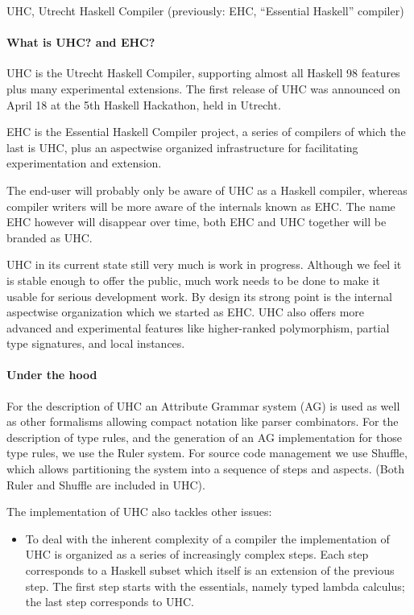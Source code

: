\begin{hcarentry}{UHC, Utrecht Haskell Compiler (previously: EHC, ``Essential Haskell'' compiler)}
\label{uhc}
\label{ehc}
\makeheader

\paragraph{What is UHC? and EHC?}
UHC is the Utrecht Haskell Compiler, supporting almost all Haskell 98 features plus many
experimental extensions.
The first release of UHC was announced on April 18 at the 5th Haskell Hackathon, held in Utrecht.

EHC is the Essential Haskell Compiler project, a series of compilers of which the last is UHC, plus 
an aspectwise organized infrastructure for facilitating experimentation and extension.

The end-user will probably only be aware of UHC as a Haskell compiler,
whereas compiler writers will be more
aware of the internals known as EHC.
The name EHC however will disappear over time, both EHC and UHC together will be branded as UHC.

UHC in its current state still very much is work in progress.
Although we feel it is stable enough to offer the public,
much work needs to be done to make it usable for serious development work.
By design its strong point is the internal aspectwise organization which we started as EHC.
UHC also offers more advanced and experimental features like higher-ranked polymorphism, partial type signatures,
and local instances.

\paragraph{Under the hood}

For the description of UHC an Attribute Grammar system (AG) is used as well as other
formalisms allowing compact notation like parser combinators.  For the
description of type rules, and the generation of an AG implementation for
those type rules, we use the Ruler system.
For source code management we use Shuffle, which allows partitioning the system into a sequence of steps and aspects.
(Both Ruler and Shuffle are included in UHC).

The implementation of UHC also tackles other issues:
\begin{itemize}
\item
   To deal with the inherent complexity of a compiler the implementation of UHC is organized as a series of
   increasingly complex steps.
   Each step corresponds to a Haskell subset which itself is an extension
   of the previous step.
   The first step starts with the essentials, namely typed lambda
   calculus; the last step corresponds to UHC.


\end{itemize}
\end{hcarentry}
